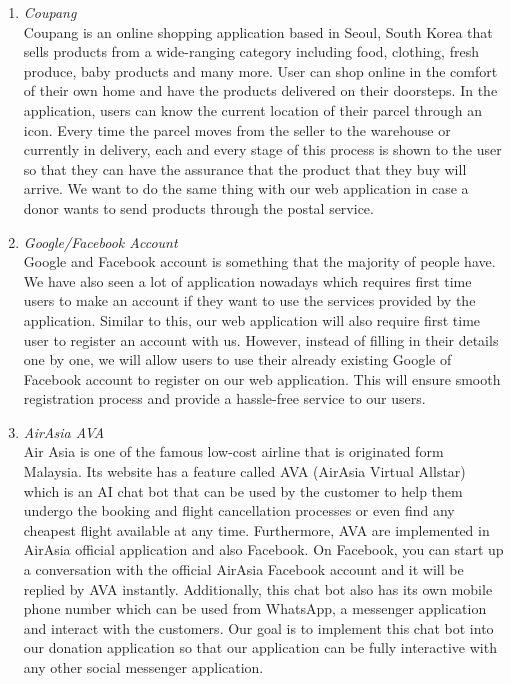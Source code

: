 \documentclass[conference]{IEEEtran}
\begin{document}
\begin{enumerate}
\item \textit{Coupang }\\
Coupang is an online shopping application based in Seoul, South Korea that sells products from a wide-ranging category including food, clothing, fresh produce, baby products and many more. User can shop online in the comfort of their own home and have the products delivered on their doorsteps. In the application, users can know the current location of their parcel through an icon. Every time the parcel moves from the seller to the warehouse or currently in delivery, each and every stage of this process is shown to the user so that they can have the assurance that the product that they buy will arrive. We want to do the same thing with our web application in case a donor wants to send products through the postal service. \\
\item \textit{Google/Facebook Account}\\
Google and Facebook account is something that the majority of people have. We have also seen a lot of application nowadays which requires first time users to make an account if they want to use the services provided by the application. Similar to this, our web application will also require first time user to register an account with us. However, instead of filling in their details one by one, we will allow users to use their already existing Google of Facebook account to register on our web application. This will ensure smooth registration process and provide a hassle-free service to our users.\\
\item \textit{AirAsia AVA} \\
Air Asia is one of the famous low-cost airline that is originated form Malaysia. Its website has a feature called AVA (AirAsia Virtual Allstar) which is an AI chat bot that can be used by the customer to help them undergo the booking and flight cancellation processes or even find any cheapest flight available at any time. Furthermore, AVA are implemented in AirAsia official application and also Facebook. On Facebook, you can start up a conversation with the official AirAsia Facebook account and it will be replied by AVA instantly. Additionally, this chat bot also has its own mobile phone number which can be used from WhatsApp, a messenger application and interact with the customers. Our goal is to implement this chat bot into our donation application so that our application can be fully interactive with any other social messenger application.\\

\end{enumerate}
\end{document}
